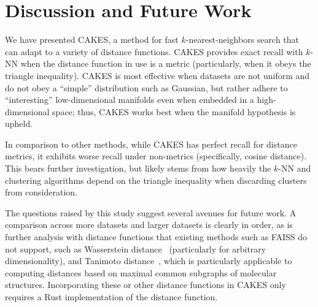 \section{Discussion and Future Work}
\label{sec:discussion}

We have presented CAKES, a method for fast $k$-nearest-neighbors search that can adapt to a variety of distance functions.
CAKES provides exact recall with $k$-NN when the distance function in use is a metric (particularly, when it obeys the triangle inequality).
CAKES is most effective when datasets are not uniform and do not obey a ``simple'' distribution such as Gaussian, but rather adhere to ``interesting'' low-dimensional manifolds even when embedded in a high-dimensional space;
thus, CAKES works best when the manifold hypothesis is upheld.

In comparison to other methods, while CAKES has perfect recall for distance metrics, it exhibits worse recall under non-metrics (specifically, cosine distance). This bears further investigation, but likely stems from how heavily the $k$-NN and clustering algorithms depend on the triangle inequality when discarding clusters from consideration.


The questions raised by this study suggest several avenues for future work.
A comparison across more datasets and larger datasets is clearly in order, as is further analysis with distance functions that existing methods such as FAISS do not support, such as Wasserstein distance~\cite{vallender1974calculation} (particularly for arbitrary dimensionality), and Tanimoto distance~\cite{bajusz2015tanimoto}, which is particularly applicable to computing distances based on maximal common subgraphs of molecular structures.  %
Incorporating these or other distance functions in CAKES only requires a Rust implementation of the distance function.



